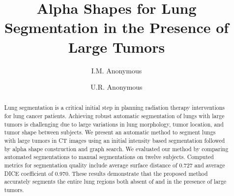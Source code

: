 \documentclass{llncs}
\begin{document}
%
\frontmatter          %
%
\pagestyle{headings}  %
%

%
%

\mainmatter              %
%
\title{Alpha Shapes for Lung Segmentation in the Presence of Large Tumors}
%
%
\author{I.M. Anonymous\\
\and U.R. Anonymous
}
%
%
%


\maketitle              %


\begin{abstract}
Lung segmentation is a critical initial step in planning radiation therapy interventions for lung cancer patients. Achieving robust automatic segmentation of lungs with large tumors is challenging due to large variations in lung morphology, tumor location, and tumor shape between subjects. We present an automatic method to segment lungs with large tumors in CT images using an initial intensity based segmentation followed by alpha shape construction and graph search. We evaluated our method by comparing automated segmentations to manual segmentations on twelve subjects. Computed metrics for segmentation quality include average surface distance of 0.727 and average DICE coefficient of 0.970. These results demonstrate that the proposed method accurately segments the entire lung regions both absent of and in the presence of large tumors. 
\end{abstract}
%
\end{document}
